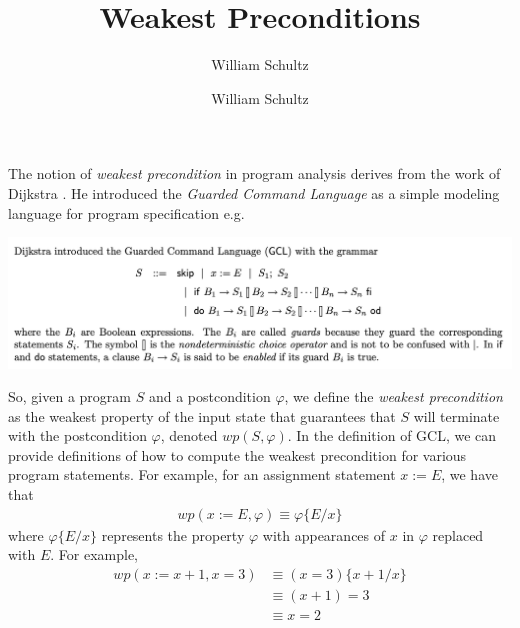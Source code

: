 \documentclass[10pt,a4paper]{article}
\author{William Schultz}
\begin{document}
\title{Weakest Preconditions}
\author{William Schultz}
\maketitle

The notion of \textit{weakest precondition} in program analysis derives from the work of Dijkstra \cite{1975dijkstrawp}. He introduced the \textit{Guarded Command Language} as a simple modeling language for program specification e.g.
\begin{center}
    \includegraphics[scale=0.3]{gcl_grammar.png}
\end{center}
So, given a program $S$ and a postcondition $\varphi$, we define the \textit{weakest precondition} as the weakest property of the input state that guarantees that $S$ will terminate with the postcondition $\varphi$, denoted $wp(S, \varphi)$. In the definition of GCL, we can provide definitions of how to compute the weakest precondition for various program statements. For example, for an assignment statement $x := E$, we have that
\begin{align*}
    wp(x := E, \varphi) \equiv \varphi\{E/x\}
\end{align*}
where $\varphi\{E/x\}$ represents the property $\varphi$ with appearances of $x$ in $\varphi$ replaced with $E$. For example,
\begin{align*}
    wp(x := x + 1, x = 3) &\equiv (x = 3)\{x+1/x\} \\
    & \equiv (x+1) = 3\\
    & \equiv x = 2\\
\end{align*}
\end{document}
